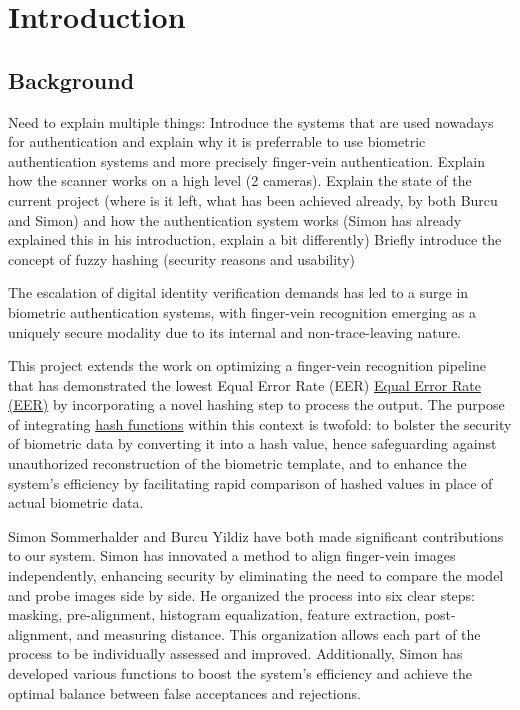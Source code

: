 \section{Introduction}

\subsection{Background}
Need to explain multiple things:
    Introduce the systems that are used nowadays for authentication and explain why it is preferrable to use biometric authentication systems and more precisely finger-vein authentication. Explain how the scanner works on a high level (2 cameras).
    Explain the state of the current project (where is it left, what has been achieved already, by both Burcu and Simon) and how the authentication system works (Simon has already explained this in his introduction, explain a bit differently)
    Briefly introduce the concept of fuzzy hashing (security reasons and usability)


The escalation of digital identity verification demands has led to a surge in biometric authentication systems, with finger-vein recognition emerging as a uniquely secure modality due to its internal and non-trace-leaving nature. 

This project extends the work on optimizing a finger-vein recognition pipeline that has demonstrated the lowest Equal Error Rate (EER) \hyperref[def:EER]{Equal Error Rate (EER)} by incorporating a novel hashing step to process the output. The purpose of integrating \hyperref[def:Hash_Function]{hash functions} within this context is twofold: to bolster the security of biometric data by converting it into a hash value, hence safeguarding against unauthorized reconstruction of the biometric template, and to enhance the system's efficiency by facilitating rapid comparison of hashed values in place of actual biometric data.


Simon Sommerhalder and Burcu Yildiz have both made significant contributions to our system. Simon has innovated a method to align finger-vein images independently, enhancing security by eliminating the need to compare the model and probe images side by side. He organized the process into six clear steps: masking, pre-alignment, histogram equalization, feature extraction, post-alignment, and measuring distance. This organization allows each part of the process to be individually assessed and improved. Additionally, Simon has developed various functions to boost the system's efficiency and achieve the optimal balance between false acceptances and rejections. 


